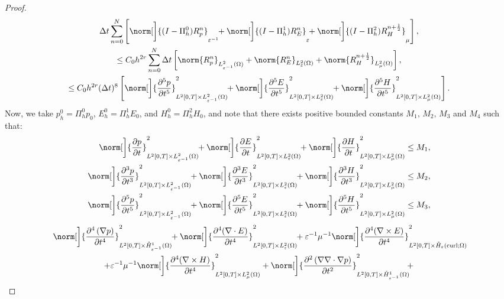 \documentclass{amsart}
\theoremstyle{thmstyleone}%
\theoremstyle{thmstyletwo}%
\theoremstyle{thmstylethree}%
\DeclareMathOperator{\curl}{curl}
\begin{document}
\begin{proof}
\begin{multline*}
  \Delta t \sum\limits_{n = 0}^N \left[ \norm[\bigg]{(I - \Pi_h^0) R_p^n}_{\varepsilon^{-1}} \!\! + \norm[\bigg]{(I - \Pi_h^1) R_E^n}_{\varepsilon} \!\! + \norm[\bigg]{(I - \Pi_h^2) R_H^{n + \frac{1}{2}}}_{\mu} \right], \\
  \le C_0 h^{2 r} \sum\limits_{n = 0}^N  \Delta t \left[ \norm{R_p^n}_{L^2_{\varepsilon^{-1}}(\Omega)} + \norm{R_E^n}_{L^2_{\varepsilon}(\Omega)} + \norm{R_H^{n + \frac{1}{2}}}_{L^2_{\mu}(\Omega)} \right], \\
  \le C_0 h^{2 r} (\Delta t)^8 \left[ \norm[\bigg]{\dfrac{\partial^5 p}{\partial t^5}}^2_{L^2[0, T] \times L^2_{\varepsilon^{-1}}(\Omega)} \!\! + \norm[\bigg]{\dfrac{\partial^5 E}{\partial t^5}}^2_{L^2[0, T] \times L^2_{\varepsilon}(\Omega)} \!\! + \norm[\bigg]{\dfrac{\partial^5 H}{\partial t^5}}^2_{L^2[0, T] \times L^2_{\mu}(\Omega)} \right].
\end{multline*}
Now, we take $p_h^0 = \Pi_h^0 p_0$, $E_h^0 = \Pi_h^1 E_0$, and $H_h^0 = \Pi_h^2 H_0$, and note that there exists positive bounded constants $M_1, \, M_2, \, M_3$ and $M_4$ such that:
\begin{align*}
  \norm[\bigg]{\dfrac{\partial p}{\partial t}}^2_{L^2[0, T] \times L^2_{\varepsilon^{-1}}(\Omega)} \!\! + \norm[\bigg]{\dfrac{\partial E}{\partial t}}^2_{L^2[0, T] \times L^2_{\varepsilon}(\Omega)} \!\! + \norm[\bigg]{\dfrac{\partial H}{\partial t}}^2_{L^2[0, T] \times L^2_{\mu}(\Omega)} &\le M_1, \\
  \norm[\bigg]{\dfrac{\partial^3 p}{\partial t^3}}^2_{L^2[0, T] \times L^2_{\varepsilon^{-1}}(\Omega)} \!\! + \norm[\bigg]{\dfrac{\partial^3 E}{\partial t^3}}^2_{L^2[0, T] \times L^2_{\varepsilon}(\Omega)} \!\! + \norm[\bigg]{\dfrac{\partial^3 H}{\partial t^3}}^2_{L^2[0, T] \times L^2_{\mu}(\Omega)} &\le M_2, \\
  \norm[\bigg]{\dfrac{\partial^5 p}{\partial t^5}}^2_{L^2[0, T] \times L^2_{\varepsilon^{-1}}(\Omega)} \!\! + \norm[\bigg]{\dfrac{\partial^5 E}{\partial t^5}}^2_{L^2[0, T] \times L^2_{\varepsilon}(\Omega)} \!\! + \norm[\bigg]{\dfrac{\partial^5 H}{\partial t^5}}^2_{L^2[0, T] \times L^2_{\mu}(\Omega)} &\le M_3,
\end{align*}
\vspace{-1em} \begin{multline*}
 \norm[\bigg]{\dfrac{\partial^4 \left(\nabla p \right)}{\partial t^4}}^2_{L^2[0, T] \times \mathring{H}^1_{\varepsilon^{-1}}(\Omega)} \!\! + 
  \norm[\bigg]{\dfrac{\partial^4 (\nabla \cdot E)}{\partial t^4}}^2_{L^2[0, T] \times L^2_\varepsilon(\Omega)} \!\! + \varepsilon^{-1} \mu^{-1} \norm[\bigg]{\dfrac{\partial^4 (\nabla \times E)}{\partial t^4}}^2_{L^2[0, T] \times \mathring{H}_\varepsilon(\curl; \Omega)} \!\! \\ + \varepsilon^{-1} \mu^{-1} \norm[\bigg]{\dfrac{\partial^4 (\nabla \times H)}{\partial t^4}}^2_{L^2[0, T] \times L^2_\mu(\Omega)} + \norm[\bigg]{\dfrac{\partial^2 \left(\nabla \nabla \cdot \nabla p \right)}{\partial t^2}}^2_{L^2[0, T] \times \mathring{H}^1_{\varepsilon^{-1}}(\Omega)} \!\! + 

\end{multline*}
\end{proof}
\end{document}
